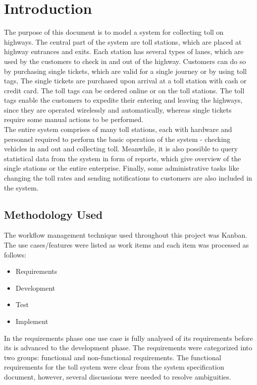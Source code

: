 \chapter{Introduction}
\noindent
The purpose of this document is to model a system for collecting toll on highways. The central part of the system are toll stations, which are placed at highway entrances and exits. Each station has several types of lanes, which are used by the customers to check in and out of the highway. Customers can do so by purchasing single tickets, which are valid for a single journey or by using toll tags, The single tickets are purchased upon arrival at a toll station with cash or credit card. The toll tags can be ordered online or on the toll stations. The toll tags enable the customers to expedite their entering and leaving the highways, since they are operated wirelessly and automatically, whereas single tickets require some manual actions to be performed. \\ The entire system comprises of many toll stations, each with hardware and personnel required to perform the basic operation of the system - checking vehicles in and out and collecting toll. Meanwhile, it is also possible to query statistical data from the system in form of reports, which give overview of the single stations or the entire enterprise. Finally, some administrative tasks like changing the toll rates and sending notifications to customers are also included in the system.

\section{Methodology Used}
The workflow management technique used throughout this project was Kanban. The use cases/features were listed as work items and each item was processed as follows:

\begin{itemize}
  \item Requirements 
  \item Development
  \item Test
  \item Implement
\end{itemize}

In the requirements phase one use case is fully analysed of its requirements before its is advanced to the development phase. The requirements were categorized into two groups: functional and non-functional requirements. The functional requirements for the toll system were clear from the system specification document, however, several discussions were needed to resolve ambiguities.

